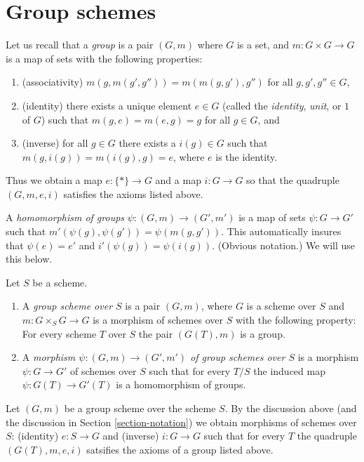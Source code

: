 \section{Group schemes}
\label{section-group-schemes}

\noindent
Let us recall that a {\it group} is a pair
$(G, m)$ where $G$ is a set, and $m : G \times G \to G$ is
a map of sets with the following properties:
\begin{enumerate}
\item (associativity) $m(g, m(g', g'')) = m(m(g, g'), g'')$
for all $g, g', g'' \in G$,
\item (identity) there exists a unique element $e \in G$
(called the {\it identity}, {\it unit}, or $1$ of $G$) such that
$m(g, e) = m(e, g) = g$ for all $g \in G$, and
\item (inverse) for all $g \in G$ there exists a $i(g) \in G$
such that $m(g, i(g)) = m(i(g), g) = e$, where $e$ is the
identity.
\end{enumerate}
Thus we obtain a map $e : \{*\} \to G$ and a map
$i : G \to G$ so that the quadruple $(G, m, e, i)$
satisfies the axioms listed above.

\medskip\noindent
A {\it homomorphism of groups} $\psi : (G, m) \to (G', m')$
is a map of sets $\psi : G \to G'$ such that
$m'(\psi(g), \psi(g')) = \psi(m(g, g'))$. This automatically
insures that $\psi(e) = e'$ and $i'(\psi(g)) = \psi(i(g))$.
(Obvious notation.) We will use this below.

\begin{definition}
\label{definition-group-scheme}
Let $S$ be a scheme.
\begin{enumerate}
\item A {\it group scheme over $S$} is a pair $(G, m)$, where
$G$ is a scheme over $S$ and $m : G \times_S G \to G$ is
a morphism of schemes over $S$ with the following property:
For every scheme $T$ over $S$ the pair $(G(T), m)$
is a group.
\item A {\it morphism $\psi : (G, m) \to (G', m')$ of group schemes over $S$}
is a morphism $\psi : G \to G'$ of schemes over $S$ such that for
every $T/S$ the induced map $\psi : G(T) \to G'(T)$ is a homomorphism
of groups.
\end{enumerate}
\end{definition}

\noindent
Let $(G, m)$ be a group scheme over the scheme $S$.
By the discussion above (and the discussion in Section \ref{section-notation})
we obtain morphisms of schemes over $S$:
(identity) $e : S \to G$ and (inverse) $i : G \to G$ such that
for every $T$ the quadruple $(G(T), m, e, i)$ satsifies the
axioms of a group listed above.

